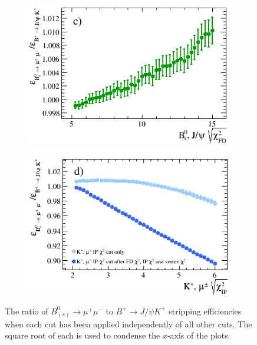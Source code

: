 \begin{figure}[tbp]
    \begin{subfigure}[b]{0.48\textwidth}
        \includegraphics[width=\textwidth]{./Figs/Selection/BsMuMu_JpsiK_FD.png}
        \label{fig:FD_ratio}
    \end{subfigure}
   \begin{subfigure}[b]{0.48\textwidth}
        \includegraphics[width=\textwidth]{./Figs/Selection/Bs2MuMu_JpsiK_daughter_IP.png}
        \label{fig:IPS_ratio}
    \end{subfigure}
    \caption{The ratio of $B^{0}_{(s)}\to\mu^{+} \mu^{-}$ to $B^{+}\to J/\psi K^{+}$ stripping efficiencies when each cut has been applied independently of all other cuts. The square root of each \chisqd is used to condense the $x$-axis of the plots.}
    \label{fig:ratioplotsJpsik}
\end{figure}


